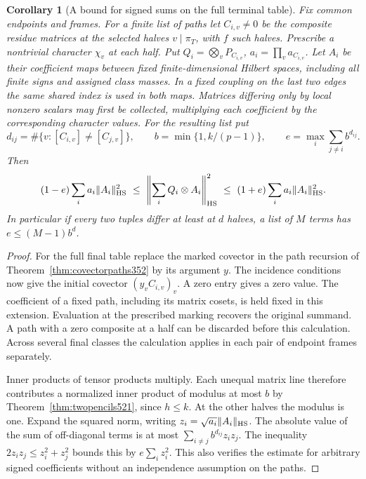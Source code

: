 \documentclass[a4paper,11pt]{article}
\newtheorem{corollary}[proposition]{Corollary}
\theoremstyle{definition}
\theoremstyle{remark}
\numberwithin{equation}{section}
\begin{document}
\begin{corollary}[A bound for signed sums on the full terminal table]
\leavevmode\label{cor:signedpencils521}
Fix common endpoints and frames. For a finite list of paths let
\(C_{i,v}\ne0\) be the composite residue matrices at the selected
halves \(v\mid\pi_T\), with \(f\) such halves. Prescribe a nontrivial
character \(\chi_v\) at each half. Put
\(Q_i=\bigotimes_v P_{C_{i,v}}\), \(a_i=\prod_v a_{C_{i,v}}\).
Let \(A_i\) be their coefficient maps between fixed finite-dimensional
Hilbert spaces, including all finite signs and assigned class masses.
In a fixed coupling on the last two edges the same shared index is used
in both maps. Matrices differing only by local nonzero scalars may
first be collected, multiplying each coefficient by the corresponding
character values. For the resulting list put
\[
 d_{ij}=\#\{v:[C_{i,v}]\ne[C_{j,v}]\},\qquad
 b=\min\{1,k/(p-1)\},\qquad
 e=\max_i\sum_{j\ne i} b^{d_{ij}} .
\]
Then
\[
 (1-e)\sum_i a_i\|A_i\|_{\rm HS}^2
 \ \le\ \left\|\sum_i Q_i\otimes A_i\right\|_{\rm HS}^2
 \ \le\ (1+e)\sum_i a_i\|A_i\|_{\rm HS}^2 .
\]
In particular if every two tuples differ at least at \(d\) halves, a
list of \(M\) terms has \(e\le (M-1)b^d\).
\end{corollary}
\begin{proof}
For the full final table replace the marked covector in the path
recursion of Theorem~\ref{thm:covectorpaths352} by its argument \(y\).
The incidence conditions now give the initial covector \((y_v C_{i,v})_v\).
A zero entry gives a zero value. The coefficient of a fixed path,
including its matrix cosets, is held fixed in this extension. Evaluation
at the prescribed marking recovers the original summand. A path with a
zero composite at a half can be discarded before this calculation.
Across several final classes the calculation applies in each pair of
endpoint frames separately.

Inner products of tensor products multiply. Each unequal matrix line
therefore contributes a normalized inner product of modulus at most
\(b\) by Theorem~\ref{thm:twopencils521}, since \(h\le k\). At the
other halves the modulus is one. Expand the squared norm, writing
\(z_i=\sqrt{a_i}\|A_i\|_{\rm HS}\). The absolute value of the
sum of off-diagonal terms is at most \(\sum_{i\ne j} b^{d_{ij}}z_i z_j\).
The inequality \(2z_i z_j\le z_i^2+z_j^2\) bounds this by
\(e\sum_i z_i^2\). This also verifies the estimate for arbitrary
signed coefficients without an independence assumption on the paths.
\end{proof}
\end{document}
